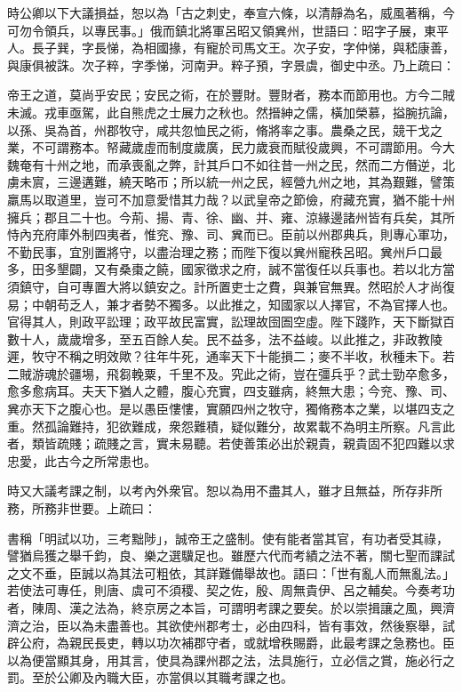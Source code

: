 \begin{pinyinscope}
時公卿以下大議損益，恕以為「古之刺史，奉宣六條，以清靜為名，威風著稱，今可勿令領兵，以專民事。」俄而鎮北將軍呂昭又領兾州，世語曰：昭字子展，東平人。長子巽，字長悌，為相國掾，有寵於司馬文王。次子安，字仲悌，與嵇康善，與康俱被誅。次子粹，字季悌，河南尹。粹子預，字景虞，御史中丞。乃上疏曰：

帝王之道，莫尚乎安民；安民之術，在於豐財。豐財者，務本而節用也。方今二賊未滅。戎車亟駕，此自熊虎之士展力之秋也。然搢紳之儒，橫加榮慕，搤腕抗論，以孫、吳為首，州郡牧守，咸共忽恤民之術，脩將率之事。農桑之民，競干戈之業，不可謂務本。帑藏歲虛而制度歲廣，民力歲衰而賦役歲興，不可謂節用。今大魏奄有十州之地，而承喪亂之弊，計其戶口不如往昔一州之民，然而二方僭逆，北虜未賔，三邊遘難，繞天略帀；所以統一州之民，經營九州之地，其為艱難，譬策羸馬以取道里，豈可不加意愛惜其力哉？以武皇帝之節儉，府藏充實，猶不能十州擁兵；郡且二十也。今荊、揚、青、徐、幽、并、雍、涼緣邊諸州皆有兵矣，其所恃內充府庫外制四夷者，惟兖、豫、司、兾而已。臣前以州郡典兵，則專心軍功，不勤民事，宜別置將守，以盡治理之務；而陛下復以兾州寵秩呂昭。兾州戶口最多，田多墾闢，又有桑棗之饒，國家徵求之府，誠不當復任以兵事也。若以北方當須鎮守，自可專置大將以鎮安之。計所置吏士之費，與兼官無異。然昭於人才尚復易；中朝苟乏人，兼才者勢不獨多。以此推之，知國家以人擇官，不為官擇人也。官得其人，則政平訟理；政平故民富實，訟理故囹圄空虛。陛下踐阼，天下斷獄百數十人，歲歲增多，至五百餘人矣。民不益多，法不益峻。以此推之，非政教陵遲，牧守不稱之明效歟？往年牛死，通率天下十能損二；麥不半收，秋種未下。若二賊游魂於疆埸，飛芻輓粟，千里不及。究此之術，豈在彊兵乎？武士勁卒愈多，愈多愈病耳。夫天下猶人之體，腹心充實，四支雖病，終無大患；今兖、豫、司、兾亦天下之腹心也。是以愚臣慺慺，實願四州之牧守，獨脩務本之業，以堪四支之重。然孤論難持，犯欲難成，衆怨難積，疑似難分，故累載不為明主所察。凡言此者，類皆疏賤；疏賤之言，實未易聽。若使善策必出於親貴，親貴固不犯四難以求忠愛，此古今之所常患也。

時又大議考課之制，以考內外衆官。恕以為用不盡其人，雖才且無益，所存非所務，所務非世要。上疏曰：

書稱「明試以功，三考黜陟」，誠帝王之盛制。使有能者當其官，有功者受其祿，譬猶烏獲之舉千鈞，良、樂之選驥足也。雖歷六代而考績之法不著，關七聖而課試之文不垂，臣誠以為其法可粗依，其詳難備舉故也。語曰：「世有亂人而無亂法。」若使法可專任，則唐、虞可不須稷、契之佐，殷、周無貴伊、呂之輔矣。今奏考功者，陳周、漢之法為，終京房之本旨，可謂明考課之要矣。於以崇揖讓之風，興濟濟之治，臣以為未盡善也。其欲使州郡考士，必由四科，皆有事效，然後察舉，試辟公府，為親民長吏，轉以功次補郡守者，或就增秩賜爵，此最考課之急務也。臣以為便當顯其身，用其言，使具為課州郡之法，法具施行，立必信之賞，施必行之罰。至於公卿及內職大臣，亦當俱以其職考課之也。


\end{pinyinscope}
